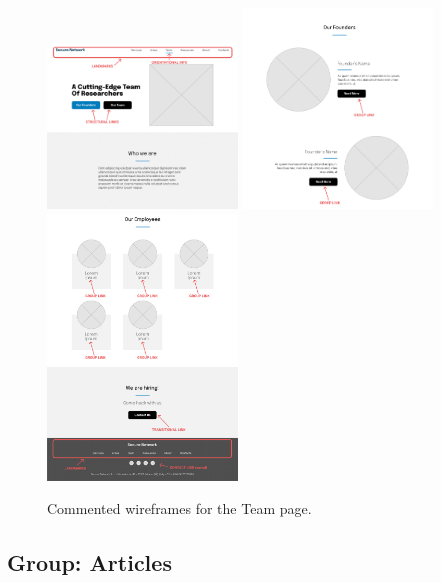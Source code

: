 \documentclass[12pt]{report}
\begin{document}
\begin{figure}[H]
	\centering
	\includegraphics[width=0.45\textwidth]{low_fid_wireframes/team/1.png}
	\includegraphics[width=0.45\textwidth]{low_fid_wireframes/team/2.png}
	\includegraphics[width=0.45\textwidth]{low_fid_wireframes/team/3.png}
	\caption{Commented wireframes for the Team page.}
\end{figure}

\subsection{Group: Articles}
\end{document}
